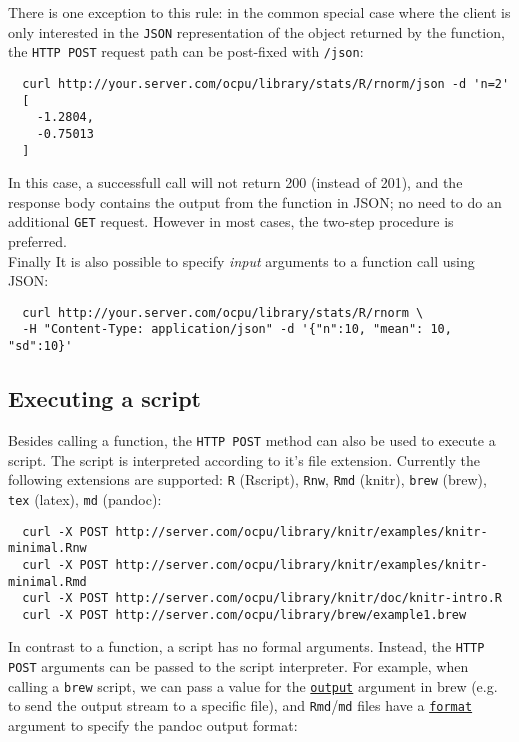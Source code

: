 \documentclass{scrartcl}\usepackage[]{graphicx}\usepackage[]{color}
\begin{document}
\noindent There is one exception to this rule: in the common special case where the client is only interested in the \texttt{JSON} representation of the object returned by the function, the \texttt{HTTP POST} request path can be post-fixed with \texttt{/json}:

\begin{verbatim}
  curl http://your.server.com/ocpu/library/stats/R/rnorm/json -d 'n=2'
  [
    -1.2804,
  	-0.75013
  ]
\end{verbatim}
In this case, a successfull call will not return 200 (instead of 201), and the response body contains the output from the function in JSON; no need to do an additional \texttt{GET} request. However in most cases, the two-step procedure is preferred.\\

\noindent Finally It is also possible to specify \emph{input} arguments to a function call using JSON:

\begin{verbatim}
  curl http://your.server.com/ocpu/library/stats/R/rnorm \
  -H "Content-Type: application/json" -d '{"n":10, "mean": 10, "sd":10}'
\end{verbatim}


\subsection{Executing a script}

Besides calling a function, the \texttt{HTTP POST} method can also be used to execute a script. The script is interpreted according to it's file extension. Currently the following extensions are supported: \texttt{R} (Rscript), \texttt{Rnw}, \texttt{Rmd} (knitr), \texttt{brew} (brew), \texttt{tex} (latex), \texttt{md} (pandoc):

\begin{verbatim}
  curl -X POST http://server.com/ocpu/library/knitr/examples/knitr-minimal.Rnw
  curl -X POST http://server.com/ocpu/library/knitr/examples/knitr-minimal.Rmd
  curl -X POST http://server.com/ocpu/library/knitr/doc/knitr-intro.R
  curl -X POST http://server.com/ocpu/library/brew/example1.brew
\end{verbatim}

\noindent In contrast to a function, a script has no formal arguments. Instead, the \texttt{HTTP POST} arguments can be passed to the script interpreter. For example, when calling a \texttt{brew} script, we can pass a value for the \href{https://www.rforge.net/doc/packages/brew/brew.html}{\texttt{output}} argument in brew (e.g. to send the output stream to a specific file), and \texttt{Rmd}/\texttt{md} files have a \href{https://www.rforge.net/doc/packages/knitr/pandoc.html}{\texttt{format}} argument to specify the pandoc output format:
\end{document}
